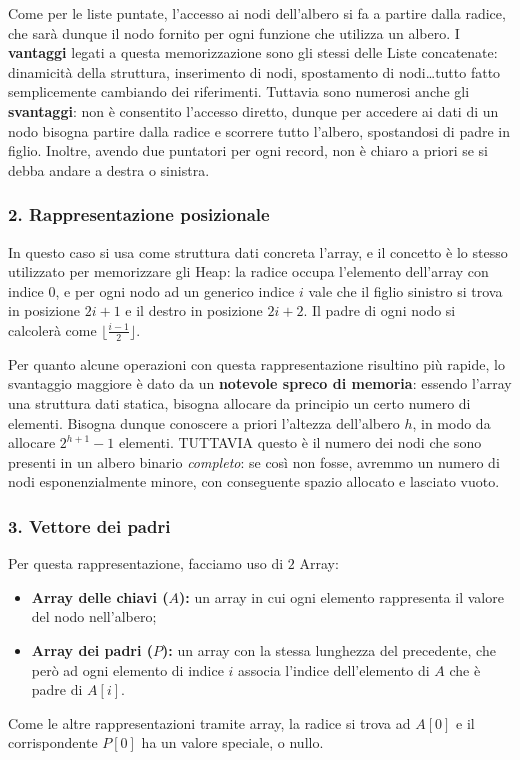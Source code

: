 \documentclass[12pt]{report}
\begin{document}
    Come per le liste puntate, l'accesso ai nodi dell'albero si fa a partire dalla radice, che sarà dunque il nodo fornito per ogni funzione che utilizza un albero.
    I \textbf{vantaggi} legati a questa memorizzazione sono gli stessi delle Liste concatenate: dinamicità della struttura, inserimento di nodi, spostamento di nodi\dots tutto fatto semplicemente cambiando dei riferimenti.
    Tuttavia sono numerosi anche gli \textbf{svantaggi}: non è consentito l'accesso diretto, dunque per accedere ai dati di un nodo bisogna partire dalla radice e scorrere tutto l'albero, spostandosi di padre in figlio. Inoltre, avendo due puntatori per ogni record, non è chiaro a priori se si debba andare a destra o sinistra.
    
    \subsubsection*{2. Rappresentazione posizionale}
    In questo caso si usa come struttura dati concreta l'array, e il concetto è lo stesso utilizzato per memorizzare gli Heap: la radice occupa l'elemento dell'array con indice $0$, e per ogni nodo ad un generico indice $i$ vale che il figlio sinistro si trova in posizione $2i+1$ e il destro in posizione $2i+2$. Il padre di ogni nodo si calcolerà come $\lfloor \frac{i-1}{2} \rfloor$.
    
    Per quanto alcune operazioni con questa rappresentazione risultino più rapide, lo svantaggio maggiore è dato da un \textbf{notevole spreco di memoria}: essendo l'array una struttura dati statica, bisogna allocare da principio un certo numero di elementi. Bisogna dunque conoscere a priori l'altezza dell'albero $h$, in modo da allocare $2^{h+1} - 1$ elementi. TUTTAVIA questo è il numero dei nodi che sono presenti in un albero binario \textit{completo}: se così non fosse, avremmo un numero di nodi esponenzialmente minore, con conseguente spazio allocato e lasciato vuoto.
    
    \subsubsection*{3. Vettore dei padri}
    Per questa rappresentazione, facciamo uso di $2$ Array:
    \begin{itemize}
    	\item \textbf{Array delle chiavi ($A$):} un array in cui ogni elemento rappresenta il valore del nodo nell'albero;
    	\item \textbf{Array dei padri ($P$):} un array con la stessa lunghezza del precedente, che però ad ogni elemento di indice $i$ associa l'indice dell'elemento di $A$ che è padre di $A[i]$.
    \end{itemize}
    Come le altre rappresentazioni tramite array, la radice si trova ad $A[0]$ e il corrispondente $P[0]$ ha un valore speciale, o nullo.
    
\end{document}
